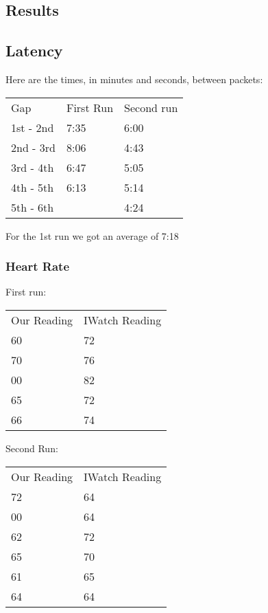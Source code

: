 	\subsection{Results}
		\subsection{Latency}

			Here are the times, in minutes and seconds, between packets:
			\begin{table}[h]
				\begin{tabular}{@{}lll@{}}
					Gap 	    &	First Run   & 	Second run 	 \\
					1st - 2nd 	&	7:35		& 	6:00     	 \\
					2nd - 3rd 	&	8:06    	& 	4:43         \\
					3rd - 4th 	&	6:47		& 	5:05         \\
					4th - 5th 	&	6:13    	& 	5:14         \\
					5th - 6th 	&	         	& 	4:24         \\
				\end{tabular}
			\end{table}

			For the 1st run we got an average of 7:18

		\subsubsection{Heart Rate}
			First run:
			\begin{table}[h]
				\begin{tabular}{@{}ll@{}}
					Our Reading & IWatch Reading \\
					60          & 72             \\
					70          & 76             \\
					00          & 82             \\
					65          & 72             \\
					66          & 74            
				\end{tabular}
			\end{table}
			Second Run:
			\begin{table}[h]
				\begin{tabular}{@{}ll@{}}
					Our Reading & IWatch Reading \\
					72          & 64             \\
					00          & 64             \\
					62          & 72             \\
					65          & 70             \\
					61          & 65      		 \\      
					64          & 64
				\end{tabular}
			\end{table}


